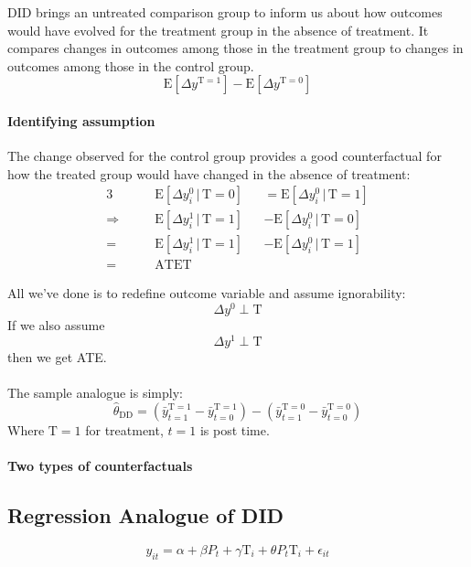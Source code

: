\documentclass[a4paper,11pt]{article}
\newcommand{\myparagraph}[1]{\paragraph{#1}\mbox{}\par}
\newcommand{\E}{\mathrm{E}}
\newcommand{\T}{\mathrm{T}}
\newcommand{\ATET}{\mathrm{ATET}}
\newcommand{\DD}{\mathrm{DD}}
\begin{document}
DID brings an untreated comparison group to inform us about how outcomes would have evolved for the treatment group in the absence of treatment. It compares changes in outcomes among those in the treatment group to changes in outcomes among those in the control group.
\begin{equation}
	\E [\Delta y^{\T = 1}] - \E[\Delta y^{\T=0}]
\end{equation}
\myparagraph{Identifying assumption}
The change observed for the control group provides a good counterfactual for how the treated group would have changed in the absence of treatment:
\begin{alignat}{3}
	&\E [\Delta y^0_i\,|\,\T = 0] 
	&& = \E [\Delta y^0_i\,|\,\T = 1] \\
	\Rightarrow \qquad
	&\E [\Delta y^1_i\,|\,\T = 1]
	&&- \E [\Delta y^0_i\,|\,\T = 0] \\
	=\,
	&\E [\Delta y^1_i\,|\,\T = 1]
	&&- \E [\Delta y^0_i\,|\,\T = 1]  \\
	=\,
	&\ATET \phantom{} \nonumber
\end{alignat}

All we've done is to redefine outcome variable and assume ignorability: 
\begin{equation}
	\Delta y^0 \perp \T
\end{equation}
If we also assume
\begin{equation}
	\Delta y^1 \perp \T
\end{equation}
then we get ATE.
\myparagraph{}
The sample analogue is simply:
\begin{equation}
	\hat{\theta}_{\DD}
	= (\bar{y}_{t=1}^{\T=1}
	- \bar{y}_{t=0}^{\T=1})
	- (\bar{y}_{t=1}^{\T=0}
	- \bar{y}_{t=0}^{\T=0})
\end{equation}
Where $\T=1$ for treatment, $t=1$ is post time.
\myparagraph{Two types of counterfactuals}
\subsection{Regression Analogue of DID}
\begin{equation}
	y_{it} = \alpha + \beta P_t +\gamma\T _i+\theta P_t\T_i + \epsilon_{it}
\end{equation}
\end{document}
